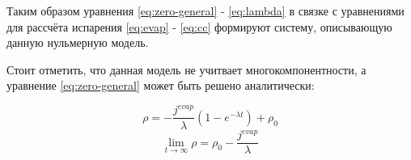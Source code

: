 Таким образом уравнения \ref{eq:zero-general} - \ref{eq:lambda} в связке с уравнениями для рассчёта испарения \ref{eq:evap} - \ref{eq:cc} формируют систему, описывающую данную нульмерную модель.

Стоит отметить, что данная модель не учитвает многокомпонентности, а уравнение \ref{eq:zero-general} может быть решено аналитически:

\begin{equation}
    \rho = -\frac{j^{evap}}{\lambda} (1 - e^{-\lambda t}) + \rho_0
\end{equation}
\begin{equation}
    \lim_{t\rightarrow \infty } \rho = \rho_0 - \frac{j^{evap}}{\lambda}
\end{equation}





\clearpage